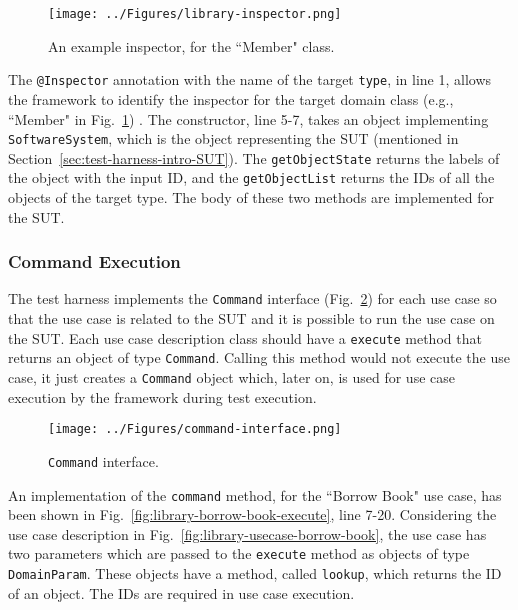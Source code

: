 \begin{figure}[h]
\centering
\texttt{[image: ../Figures/library-inspector.png]}
\caption{An example inspector, for the ``Member" class.}
\label{fig:library-inspector}
\end{figure}

The \texttt{@Inspector} annotation with the name of the target \texttt{type}, in line 1, allows the framework to identify the inspector for the target domain class (e.g., ``Member" in Fig.~\ref{fig:library-inspector}) . The constructor, line 5-7, takes an object implementing \texttt{SoftwareSystem}, which is the object representing the SUT (mentioned in Section~\ref{sec:test-harness-intro-SUT}). The \texttt{getObjectState} returns the labels of the object with the input ID, and the \texttt{getObjectList} returns the IDs of all the objects of the target type. The body of these two methods are implemented for the SUT.

\subsubsection{Command Execution}
\label{sec:test-harness-command-execution}
The test harness implements the \texttt{Command} interface (Fig.~\ref{fig:test-harness-command-interface}) for each use case so that the use case is related to the SUT and it is possible to run the use case on the SUT. Each use case description class should have a \texttt{execute} method that returns an object of type \texttt{Command}. Calling this method would not execute the use case, it just creates a \texttt{Command} object which, later on, is used for use case execution by the framework during test execution.

\begin{figure}[h]
\centering
\texttt{[image: ../Figures/command-interface.png]}
\caption{\texttt{Command} interface.}
\label{fig:test-harness-command-interface}
\end{figure}

An implementation of the \texttt{command} method, for the ``Borrow Book" use case, has been shown in Fig.~\ref{fig:library-borrow-book-execute}, line 7-20. Considering the use case description in Fig.~\ref{fig:library-usecase-borrow-book}, the use case has two parameters which are passed to the \texttt{execute} method as objects of type \texttt{DomainParam}. These objects have a method, called \texttt{lookup}, which returns the ID of an object. The IDs are required in use case execution.

